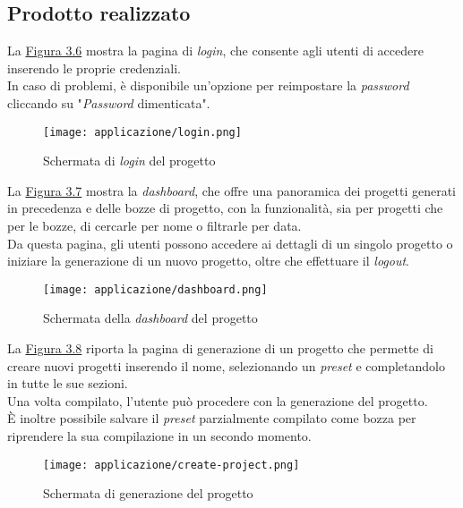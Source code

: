 \subsection{Prodotto realizzato}
\label{subsec:prodotto-realizzato}

La {\hyperref[fig:login]{Figura 3.6}} mostra la pagina di \textit{login}, che consente agli utenti di accedere inserendo le proprie credenziali.\\
In caso di problemi, è disponibile un'opzione per reimpostare la \textit{password} cliccando su "\textit{Password} dimenticata".
\begin{figure}[H]
    \centering
    \texttt{[image: applicazione/login.png]}
    \caption{Schermata di \textit{login} del progetto}
    \label{fig:login}
\end{figure}

\pagebreak
\noindent La {\hyperref[fig:dashboard]{Figura 3.7}} mostra la \textit{dashboard}, che offre una panoramica dei progetti generati in precedenza e delle bozze di progetto, con la funzionalità, sia per progetti che per le bozze,
di cercarle per nome o filtrarle per data. \\
Da questa pagina, gli utenti possono accedere ai dettagli di un singolo progetto o iniziare la generazione di un nuovo progetto, oltre che effettuare il \textit{logout}.\\
\begin{figure}[H]
    \centering
    \texttt{[image: applicazione/dashboard.png]}
    \caption{Schermata della \textit{dashboard} del progetto}
    \label{fig:dashboard}
\end{figure}

\pagebreak
\noindent La {\hyperref[fig:create-project]{Figura 3.8}} riporta la pagina di generazione di un progetto che permette di creare nuovi progetti inserendo il nome, selezionando un \textit{preset} e completandolo in tutte le sue sezioni.\\
Una volta compilato, l’utente può procedere con la generazione del progetto. \\
È inoltre possibile salvare il \textit{preset} parzialmente compilato come bozza per riprendere la sua compilazione in un secondo momento.
\begin{figure}[H]
    \centering
    \texttt{[image: applicazione/create-project.png]}
    \caption{Schermata di generazione del progetto}
    \label{fig:create-project}
\end{figure}


